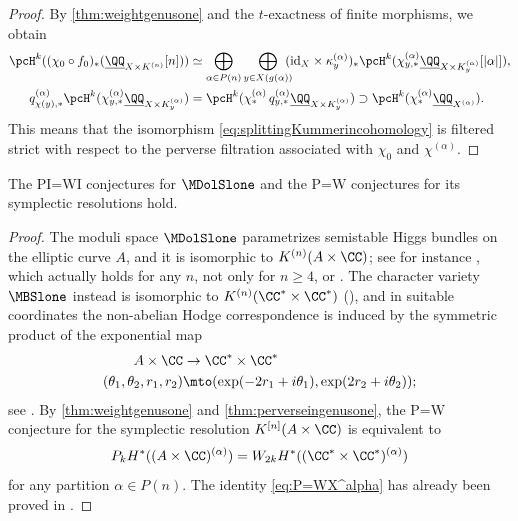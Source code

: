 \begin{proof} By \cref{thm:weightgenusone} and the $t$-exactness of finite morphisms, we obtain
\begin{align*}
\pcH^{k}((\chi_0 \circ f_0)_* (\underline{\QQ}_{X \times K^{(n)}}[n])) &\simeq  \bigoplus_{\alpha \in P(n)} \bigoplus_{y \in X(g(\alpha))}\hspace*{-2mm} (\mathrm{id}_X \times \kappa^{(\alpha)}_y)_* \pcH^{k} (\chi^{(\alpha)}_{y,*}\underline{\QQ}_{X \times K^{(\alpha)}_y}[|\alpha|]),
\\
q^{(\alpha)}_{\chi(y), *}\pcH^{k}(\chi^{(\alpha)}_{y,*}\underline{\QQ}_{X \times K^{(\alpha)}_y}) &= \pcH^{k}(\chi^{(\alpha)}_{ *} \,q^{(\alpha)}_{y, *}\underline{\QQ}_{X \times K^{(\alpha)}_y}) \supset \pcH^{k}(\chi^{(\alpha)}_{ *} \underline{\QQ}_{X^{(\alpha)}}).
\end{align*}
This means that the isomorphism \eqref{eq:splittingKummerincohomology} is filtered strict with respect to the perverse filtration associated with $\chi_0$ and $\chi^{(\alpha)}$.
\end{proof}

\begin{thm}\label{thm:PI=IWgenusone}
The PI=WI conjectures for $\MDolSlone$ and the P=W conjectures for its symplectic resolutions hold.
\end{thm}
\begin{proof}
The moduli space $\MDolSlone$ parametrizes semistable Higgs bundles on the elliptic curve $A$, and it is isomorphic to $K^{(n)}(A \times \CC)$; see for instance \cite[Th.\,4.27(v)]{FGPN14}, which actually holds for any $n$, not only for $n \geq 4$, or \cite{Groechenig14}. The character variety $\MBSlone$ instead is isomorphic to $K^{(n)}(\CC^* \times \CC^*)$ (\cf \cite[Proof of Th.\,5.3.2]{MMS}), and in suitable coordinates the non-abelian Hodge correspondence is induced by the symmetric product of the exponential map
\begin{align*}
A \times \CC & \to \CC^* \times \CC^*\\
(\theta_1, \theta_2, r_1, r_2) & \mto (\exp(-2r_1+ i \theta_1), \exp(2r_2+ i \theta_2));
\end{align*}
see \cite[Ex.\,after Prop.\,1.5]{Simpson92}.
By \cref{thm:weightgenusone} and \ref{thm:perverseingenusone}, the P=W conjecture for the symplectic resolution $K^{[n]}(A \times \CC)$ is equivalent to
\begin{equation}\label{eq:P=WX^alpha}
P_k H^*((A \times \CC)^{(\alpha)}) = W_{2k} H^*((\CC^* \times \CC^*)^{(\alpha)})
\end{equation}
for any partition $\alpha\!\in\! P(n)$. The identity \eqref{eq:P=WX^alpha} has already been proved in \cite[Lem.\,3.1.1 \& 3.2.2]{deCataldoHauselMigliorini2013}.
\end{proof}

